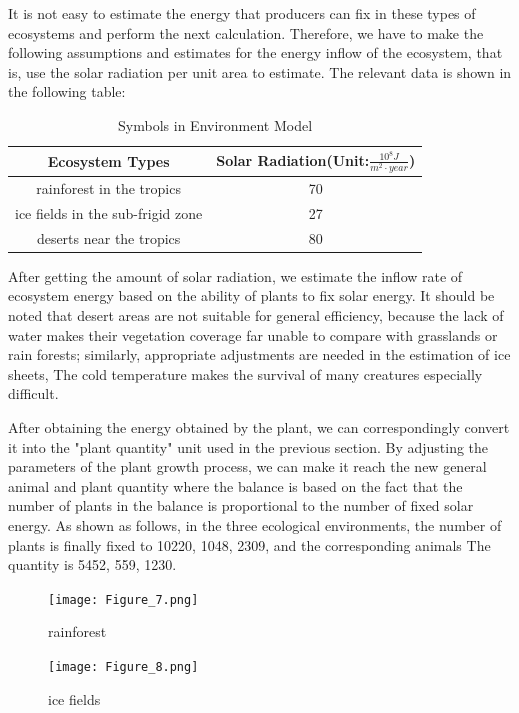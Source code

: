 \documentclass{mcmthesis}
\begin{document}
It is not easy to estimate the energy that producers can fix in these types of ecosystems and perform the next calculation. Therefore, we have to make the following assumptions and estimates for the energy inflow of the ecosystem, that is, use the solar radiation per unit area to estimate. The relevant data is shown in the following table:
\begin{table}[h]
\centering
\caption{Symbols in Environment Model}
\begin{tabular}{cc}
\toprule
\textbf{Ecosystem Types}          & \textbf{Solar Radiation(Unit:$\frac{10^{8}J}{m^{2}\cdot year}$)}    \\
\midrule
rainforest in the tropics         &  70            \\
ice fields in the sub-frigid zone &  27            \\
deserts near the tropics          &  80            \\

\bottomrule
\end{tabular}\label{tb:Variables6}
\end{table}


After getting the amount of solar radiation, we estimate the inflow rate of ecosystem energy based on the ability of plants to fix solar energy. It should be noted that desert areas are not suitable for general efficiency, because the lack of water makes their vegetation coverage far unable to compare with grasslands or rain forests; similarly, appropriate adjustments are needed in the estimation of ice sheets, The cold temperature makes the survival of many creatures especially difficult.

After obtaining the energy obtained by the plant, we can correspondingly convert it into the "plant quantity" unit used in the previous section. By adjusting the parameters of the plant growth process, we can make it reach the new general animal and plant quantity where the balance is based on the fact that the number of plants in the balance is proportional to the number of fixed solar energy. As shown as follows, in the three ecological environments, the number of plants is finally fixed to 10220, 1048, 2309, and the corresponding animals The quantity is 5452, 559, 1230.

\begin{figure}[h]
    \centering
    \texttt{[image: Figure\_7.png]}
    \caption{rainforest}\label{fig:simulate6}
\end{figure}

\begin{figure}[h]
    \centering
    \texttt{[image: Figure\_8.png]}
    \caption{ice fields}\label{fig:simulate7}
\end{figure}
\end{document}
